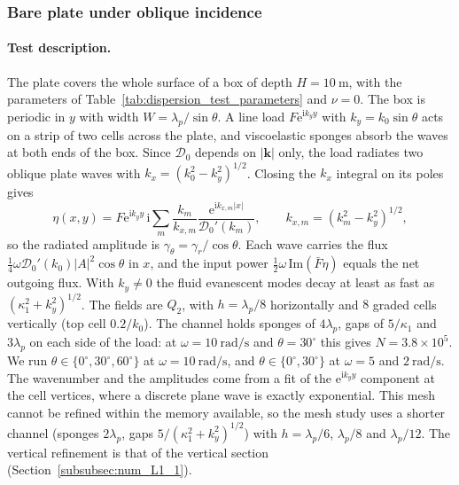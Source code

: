 
\subsubsection{Bare plate under oblique incidence}\label{subsubsec:num_L3_1}

\paragraph{Test description.} The plate covers the whole surface of a box of depth $H=10~\si{\meter}$, with the parameters of Table~\ref{tab:dispersion_test_parameters} and $\nu=0$. The box is periodic in $y$ with width $W=\lambda_p/\sin\theta$. A line load $F\mathrm{e}^{\mathrm{i}k_yy}$ with $k_y=k_0\sin\theta$ acts on a strip of two cells across the plate, and viscoelastic sponges absorb the waves at both ends of the box. Since $\mathcal{D}_0$ depends on $|\boldsymbol{k}|$ only, the load radiates two oblique plate waves with $k_x=(k_0^2-k_y^2)^{1/2}$. Closing the $k_x$ integral on its poles gives
\begin{equation}
    \eta(x,y)=F\mathrm{e}^{\mathrm{i}k_yy}\,\mathrm{i}\sum_m\frac{k_m}{k_{x,m}}\frac{\mathrm{e}^{\mathrm{i}k_{x,m}|x|}}{\mathcal{D}_0'(k_m)},\qquad k_{x,m}=(k_m^2-k_y^2)^{1/2},
\end{equation}
so the radiated amplitude is $\gamma_\theta=\gamma_r/\cos\theta$. Each wave carries the flux $\tfrac14\omega\mathcal{D}_0'(k_0)|A|^2\cos\theta$ in $x$, and the input power $\tfrac12\omega\,\mathrm{Im}(\bar F\eta)$ equals the net outgoing flux. With $k_y\neq0$ the fluid evanescent modes decay at least as fast as $(\kappa_1^2+k_y^2)^{1/2}$. The fields are $Q_2$, with $h=\lambda_p/8$ horizontally and $8$ graded cells vertically (top cell $0.2/k_0$). The channel holds sponges of $4\lambda_p$, gaps of $5/\kappa_1$ and $3\lambda_p$ on each side of the load: at $\omega=10~\si{\radian\per\second}$ and $\theta=30^\circ$ this gives $N=3.8\times10^5$. We run $\theta\in\{0^\circ,30^\circ,60^\circ\}$ at $\omega=10~\si{\radian\per\second}$, and $\theta\in\{0^\circ,30^\circ\}$ at $\omega=5$ and $2~\si{\radian\per\second}$. The wavenumber and the amplitudes come from a fit of the $\mathrm{e}^{\mathrm{i}k_yy}$ component at the cell vertices, where a discrete plane wave is exactly exponential. This mesh cannot be refined within the memory available, so the mesh study uses a shorter channel (sponges $2\lambda_p$, gaps $5/(\kappa_1^2+k_y^2)^{1/2}$) with $h=\lambda_p/6$, $\lambda_p/8$ and $\lambda_p/12$. The vertical refinement is that of the vertical section (Section~\ref{subsubsec:num_L1_1}).

